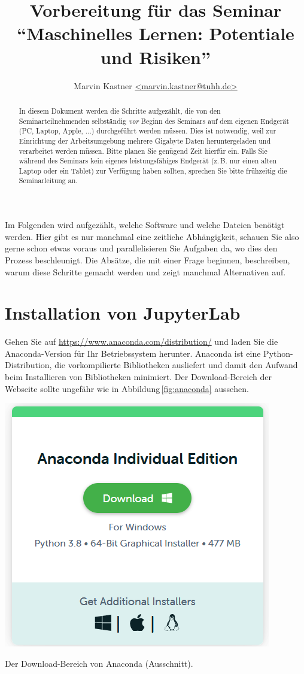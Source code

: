 \documentclass{tufte-handout}
\title{Vorbereitung für das Seminar \enquote{Maschinelles Lernen: Potentiale und Risiken}}
\author{Marvin Kastner \href{mailto:marvin.kastner@tuhh.de}{<marvin.kastner@tuhh.de>}}
\begin{document}
\maketitle%

\begin{abstract}
\noindent
In diesem Dokument werden die Schritte aufgezählt, die von den Seminarteilnehmenden selbständig \emph{vor} Beginn des Seminars auf dem eigenen Endgerät (PC, Laptop, Apple, ...) durchgeführt werden müssen.
Dies ist notwendig, weil zur Einrichtung der Arbeitsumgebung mehrere Gigabyte Daten heruntergeladen und verarbeitet werden müssen.
Bitte planen Sie genügend Zeit hierfür ein.
Falls Sie während des Seminars kein eigenes leistungsfähiges Endgerät (z.\,B. nur einen alten Laptop oder ein Tablet) zur Verfügung haben sollten, sprechen Sie bitte frühzeitig die Seminarleitung an.
\end{abstract}

Im Folgenden wird aufgezählt, welche Software und welche Dateien benötigt werden.
Hier gibt es nur manchmal eine zeitliche Abhängigkeit, schauen Sie also gerne schon etwas voraus und parallelisieren Sie Aufgaben da, wo dies den Prozess beschleunigt.
Die Absätze, die mit einer Frage beginnen, beschreiben, warum diese Schritte gemacht werden und zeigt manchmal Alternativen auf.


\section{Installation von JupyterLab}

Gehen Sie auf
\url{https://www.anaconda.com/distribution/} 
und laden Sie die Anaconda-Version für Ihr Betriebssystem herunter.
Anaconda ist eine Python-Distribution, die vorkompilierte Bibliotheken ausliefert und damit den Aufwand beim Installieren von Bibliotheken minimiert.
Der Download-Bereich der Webseite sollte ungefähr wie in Abbildung\,\ref{fig:anaconda} aussehen.

\begin{marginfigure}
  \includegraphics{anaconda}
  \caption{Der Download-Bereich von Anaconda (Ausschnitt).}%
\label{fig:anaconda}
\end{marginfigure}
\end{document}
